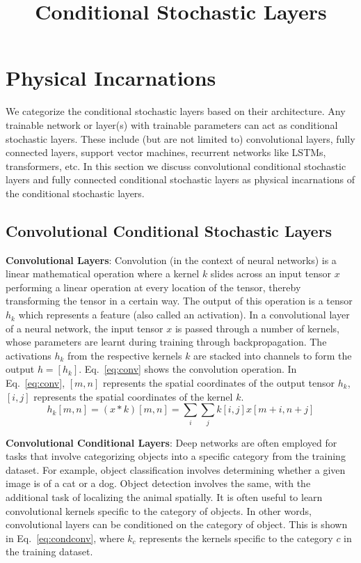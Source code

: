 \documentclass[12pt, letterpaper]{article}
\title{Conditional Stochastic Layers}
\date{}
\begin{document}
\vspace{-5cm}
\maketitle
\vspace{-2cm}


\section{Physical Incarnations}
We categorize the conditional stochastic layers based on their architecture.
Any trainable network or layer(s) with trainable parameters can act as conditional stochastic layers. 
These include (but are not limited to) convolutional layers, fully connected layers, support vector machines, recurrent networks like LSTMs, transformers, etc. In this section we discuss convolutional conditional stochastic layers and fully connected conditional  stochastic layers as physical incarnations of the conditional stochastic layers. 
\subsection{Convolutional Conditional Stochastic Layers}

\textbf{Convolutional Layers}: Convolution (in the context of neural networks) is a linear mathematical operation where a kernel $k$ slides across an input tensor $x$ performing a linear operation at every location of the tensor, thereby transforming the tensor in a certain way. 
The output of this operation is a tensor $h_k$ which represents a feature (also called an activation). 
In a convolutional layer of a neural network, the input tensor $x$ is passed through a number of kernels, whose parameters are learnt during training through backpropagation. 
The activations $h_k$ from the respective kernels $k$ are stacked into channels to form the output $h=[h_k]$. Eq.~\eqref{eq:conv} shows the convolution operation. 
In Eq.~\eqref{eq:conv}, $[m,n]$ represents the spatial coordinates of the output tensor $h_k$, $[i,j]$ represents the spatial coordinates of the kernel $k$.
\begin{equation}
  h_k[m,n]=(x * k)[m,n]=\sum_i \sum_j k[i,j]x[m+i,n+j]
  \label{eq:conv}
\end{equation}

\noindent \textbf{Convolutional Conditional Layers}: Deep networks are often employed for tasks that involve categorizing objects into a specific category from the training dataset. For example, object classification involves determining whether a given image is of a cat or a dog. Object detection involves the same, with the additional task of localizing the animal spatially. It is often useful to learn convolutional kernels specific to the category of objects. In other words, convolutional layers can be conditioned on the category of object. This is shown in Eq.~\eqref{eq:condconv}, where $k_c$ represents the kernels specific to the category $c$ in the training dataset.
\end{document}
